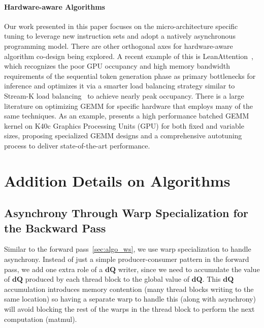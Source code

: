 \documentclass{article}
\newcommand{\vdQ}{\mathbf{dQ}}
\begin{document}
\paragraph{Hardware-aware Algorithms}
Our work presented in this paper focuses on the micro-architecture
specific tuning to leverage new instruction sets and adopt a natively
asynchronous programming model. There are other orthogonal axes for
hardware-aware algorithm co-design being explored.
A recent example of this is LeanAttention~\citep{sanovar2024-leanattention},
which recognizes the poor GPU occupancy and high memory bandwidth requirements
of the sequential token generation phase as primary bottlenecks for inference
and optimizes it via a smarter load balancing strategy similar to Stream-K
load balancing~\citep{streamk} to achieve nearly peak occupancy.
There is a large literature on optimizing GEMM for specific hardware that employs
many of the same techniques.
As an example, \citet{abdel2016batched} presents a high performance batched GEMM kernel on
K40c Graphics Processing Units (GPU) for both fixed and variable sizes,
proposing specialized GEMM designs
and a comprehensive autotuning process to deliver state-of-the-art 
performance.


\section{Addition Details on Algorithms}

\subsection{Asynchrony Through Warp Specialization for the Backward Pass}
\label{sec:algo_ws_bwd}

Similar to the forward pass~\cref{sec:algo_ws}, we use warp specialization to
handle asynchrony.
Instead of just a simple producer-consumer pattern in the forward pass, we add
one extra role of a $\vdQ$ writer, since we need to accumulate the value of $\vdQ$
produced by each thread block to the global value of $\vdQ$.
This $\vdQ$ accumulation introduces memory contention (many thread blocks writing to the same
location) so having a separate warp to handle this (along with asynchrony) will
avoid blocking the rest of the warps in the thread block to perform the next
computation (matmul).
\end{document}
